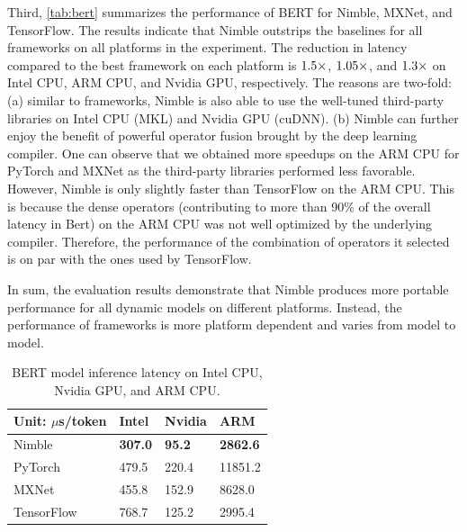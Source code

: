 Third, \autoref{tab:bert} summarizes the performance of BERT for Nimble, MXNet, and TensorFlow. The results indicate that Nimble outstrips the baselines for all frameworks on all platforms in the experiment. The reduction in latency compared to the best framework on each platform is $\fpeval{round(455.8/307, 1)}\times$, $\fpeval{round(2995.4/2862.6, 2)}\times$, and $\fpeval{round(125.2/95.2, 1)}\times$ on Intel CPU, ARM CPU, and Nvidia GPU, respectively.
The reasons are two-fold: (a) similar to frameworks, Nimble is also able to use the well-tuned third-party libraries on Intel CPU (MKL) and Nvidia GPU (cuDNN). (b) Nimble can further enjoy the benefit of powerful operator fusion brought by the deep learning compiler. One can observe that we obtained more speedups on the ARM CPU for PyTorch and MXNet as the third-party libraries performed less favorable. However, Nimble is only slightly faster than TensorFlow on the ARM CPU. This is because the dense operators (contributing to more than 90\% of the overall latency in Bert) on the ARM CPU was not well optimized by the underlying compiler. Therefore, the performance of the combination of operators it selected is on par with the ones used by TensorFlow.

In sum, the evaluation results demonstrate that Nimble produces more portable performance for all dynamic models on different platforms. Instead, the performance of frameworks is more platform dependent and varies from model to model.

\begin{table}[t]
\centering
\begin{tabular}{l|lll}
\toprule
Unit: $\mu$s/token    & Intel  &   Nvidia       &  ARM     \\ \midrule
Nimble     & \bf{307.0} & \bf{95.2} & \bf{2862.6} \\
PyTorch & 479.5 & 220.4 & 11851.2 \\
MXNet      & 455.8 & 152.9 & 8628.0   \\
TensorFlow & 768.7 & 125.2 & 2995.4 \\
\bottomrule
\end{tabular}
\caption{BERT model inference latency on Intel CPU, Nvidia GPU, and ARM CPU.}
\label{tab:bert}
\end{table}

